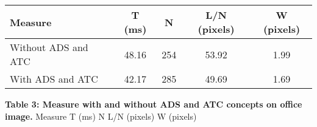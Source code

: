 \begin{longtable}[]{@{}lcccc@{}}
\toprule
Measure & T (ms) & N & L/N (pixels) & W (pixels)\tabularnewline
\midrule
\endhead
Without ADS and ATC & 48.16 & 254 & 53.92 & 1.99\tabularnewline
With ADS and ATC & 42.17 & 285 & 49.69 & 1.69\tabularnewline
\bottomrule
\end{longtable}

\textbf{Table 3: Measure with and without ADS and ATC concepts on office
image.}\textbar{} Measure \textbar{} T (ms) \textbar{} N \textbar{} L/N
(pixels) \textbar{} W (pixels) \textbar{}
